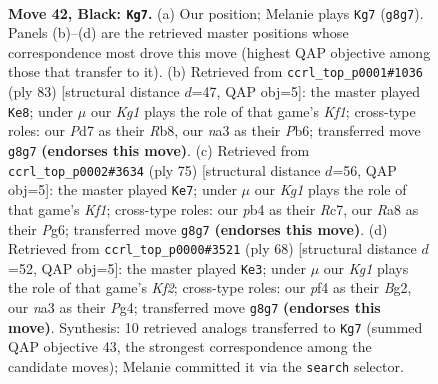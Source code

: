 \documentclass[11pt]{article}
\begin{document}
\clearpage

\begin{figure}[p]\centering
\begin{subfigure}{0.46\textwidth}\centering
\resizebox{\linewidth}{!}{%
\newchessgame
\chessboard[
  setfen={r1b3k1/p2p4/1pp5/5p1p/1PPPnP2/NB6/P6P/2R1K3 b - - 2 42},
  showmover=false,
  pgfstyle=straightmove, color=movearrow, markmove={g8-g7}
]}
\caption{}
\end{subfigure}\hfill
\begin{subfigure}{0.46\textwidth}\centering
\resizebox{\linewidth}{!}{%
\newchessgame
\chessboard[
  setfen={1r3k2/5p2/1p2p1p1/3nP1Pp/P3p3/1P6/3B1PP1/2R2K2 b - - 4 42},
  showmover=false,
  pgfstyle=straightmove, color=movearrow, markmove={f8-e8}
]}
\caption{}
\end{subfigure}
\\[4pt]
\begin{subfigure}{0.46\textwidth}\centering
\resizebox{\linewidth}{!}{%
\newchessgame
\chessboard[
  setfen={5k2/2r2p2/4pnp1/p7/P2Pp2p/1B2P2P/5PP1/1R3K2 b - - 5 38},
  showmover=false,
  pgfstyle=straightmove, color=movearrow, markmove={f8-e7}
]}
\caption{}
\end{subfigure}\hfill
\begin{subfigure}{0.46\textwidth}\centering
\resizebox{\linewidth}{!}{%
\newchessgame
\chessboard[
  setfen={1r4k1/5bp1/4np1p/1p1N3P/p3P1P1/8/PP3KB1/3R4 w - - 1 35},
  showmover=false,
  pgfstyle=straightmove, color=movearrow, markmove={f2-e3}
]}
\caption{}
\end{subfigure}
\caption{\textbf{Move 42, Black: \texttt{Kg7}.} (a) Our position; Melanie plays \texttt{Kg7} (\texttt{g8g7}). Panels (b)--(d) are the retrieved master positions whose correspondence most drove this move (highest QAP objective among those that transfer to it). (b) Retrieved from \texttt{ccrl\_top\_p0001\#1036} (ply 83) [structural distance $d$=47, QAP obj=5]: the master played \texttt{Ke8}; under $\mu$ our \emph{Kg1} plays the role of that game's \emph{Kf1}; cross-type roles: our \emph{P}d7 as their \emph{R}b8, our \emph{n}a3 as their \emph{P}b6; transferred move \texttt{g8g7} \textbf{(endorses this move)}. (c) Retrieved from \texttt{ccrl\_top\_p0002\#3634} (ply 75) [structural distance $d$=56, QAP obj=5]: the master played \texttt{Ke7}; under $\mu$ our \emph{Kg1} plays the role of that game's \emph{Kf1}; cross-type roles: our \emph{p}b4 as their \emph{R}c7, our \emph{R}a8 as their \emph{P}g6; transferred move \texttt{g8g7} \textbf{(endorses this move)}. (d) Retrieved from \texttt{ccrl\_top\_p0000\#3521} (ply 68) [structural distance $d$=52, QAP obj=5]: the master played \texttt{Ke3}; under $\mu$ our \emph{Kg1} plays the role of that game's \emph{Kf2}; cross-type roles: our \emph{p}f4 as their \emph{B}g2, our \emph{n}a3 as their \emph{P}g4; transferred move \texttt{g8g7} \textbf{(endorses this move)}. Synthesis: 10 retrieved analogs transferred to \texttt{Kg7} (summed QAP objective 43, the strongest correspondence among the candidate moves); Melanie committed it via the \texttt{search} selector.}
\label{fig:thought-m83}
\end{figure}
\end{document}
